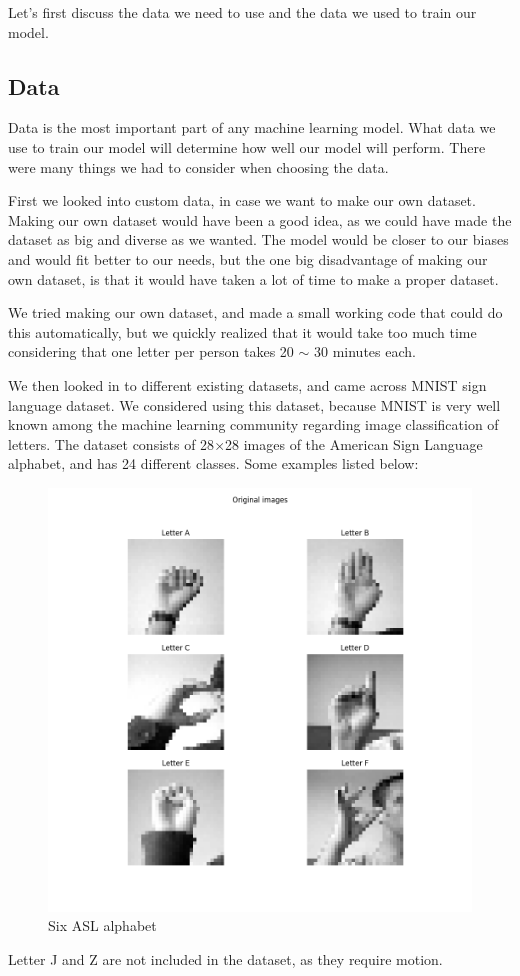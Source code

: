 \documentclass[../paper.tex]{subfiles}
\begin{document}
    Let's first discuss the data we need to use and the data we used to train our model.
    \subsection{Data}
    Data is the most important part of any machine learning model.
    What data we use to train our model will determine how well our model will perform. 
    There were many things we had to consider when choosing the data. 

    First we looked into custom data, in case we want to make our own dataset. 
    Making our own dataset would have been a good idea, 
    as we could have made the dataset as big and diverse as we wanted.
    The model would be closer to our biases and would fit better to our needs, 
    but the one big disadvantage of making our own dataset, is that it would have taken a lot of time to make a proper dataset. 

    We tried making our own dataset, and made a small working code that could do this automatically, 
    but we quickly realized that it would take too much time considering that one letter per person takes 20 $\sim$ 30 minutes each. 

    We then looked in to different existing datasets, and came across MNIST sign language dataset\cite{d0}. 
    We considered using this dataset, because MNIST is very well known among the machine learning community regarding image classification of letters\cite{o0}.
    The dataset consists of 28$\times$28 images of the American Sign Language alphabet, 
    and has 24 different classes. 
    Some examples listed below:
    \begin{figure}[h]
        \centering
        \includegraphics[width=\linewidth]{letters_grid_6} 
        \caption{Six ASL alphabet}
        \label{fig:six_asl_alphabet}
    \end{figure}
    Letter J and Z are not included in the dataset, as they require motion. 
\end{document}
